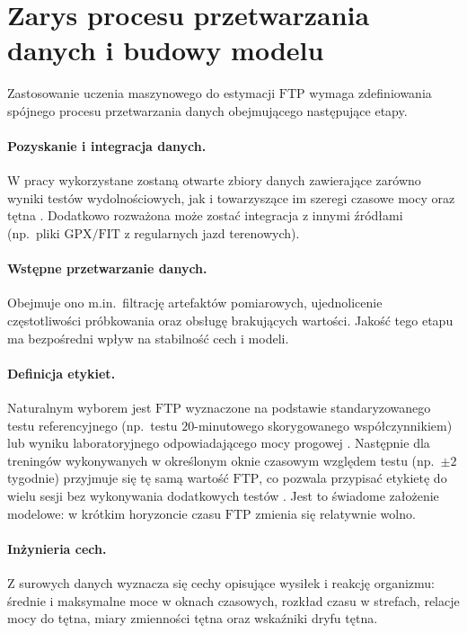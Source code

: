\section{Zarys procesu przetwarzania danych i budowy modelu}

Zastosowanie uczenia maszynowego do estymacji $\mathrm{FTP}$ wymaga zdefiniowania spójnego procesu przetwarzania danych obejmującego następujące etapy.

\paragraph{Pozyskanie i integracja danych.}
W pracy wykorzystane zostaną otwarte zbiory danych zawierające zarówno wyniki testów wydolnościowych, jak i towarzyszące im szeregi czasowe mocy oraz tętna \cite{kaggle_redlineracer_road_cycling_performance_testing,figshare_cycling_analytics_datasets,stockwell2023mlftp}.
Dodatkowo rozważona może zostać integracja z innymi źródłami (np.\ pliki $\mathrm{GPX}/\mathrm{FIT}$ z regularnych jazd terenowych).

\paragraph{Wstępne przetwarzanie danych.}
Obejmuje ono m.in.\ filtrację artefaktów pomiarowych, ujednolicenie częstotliwości próbkowania oraz obsługę brakujących wartości.
Jakość tego etapu ma bezpośredni wpływ na stabilność cech i modeli.

\paragraph{Definicja etykiet.}
Naturalnym wyborem jest $\mathrm{FTP}$ wyznaczone na podstawie standaryzowanego testu referencyjnego (np.\ testu $20$-minutowego skorygowanego współczynnikiem) lub wyniku laboratoryjnego odpowiadającego mocy progowej \cite{borszcz2018ftp,karsten2021cpftp,denham2020predictftp}.
Następnie dla treningów wykonywanych w określonym oknie czasowym względem testu (np.\ $\pm 2$ tygodnie) przyjmuje się tę samą wartość $\mathrm{FTP}$, co pozwala przypisać etykietę do wielu sesji bez wykonywania dodatkowych testów \cite{stockwell2023mlftp,denham2020predictftp}.
Jest to świadome założenie modelowe: w krótkim horyzoncie czasu $\mathrm{FTP}$ zmienia się relatywnie wolno.

\paragraph{Inżynieria cech.}
Z surowych danych wyznacza się cechy opisujące wysiłek i reakcję organizmu: średnie i maksymalne moce w oknach czasowych, rozkład czasu w strefach, relacje mocy do tętna, miary zmienności tętna oraz wskaźniki dryfu tętna.

